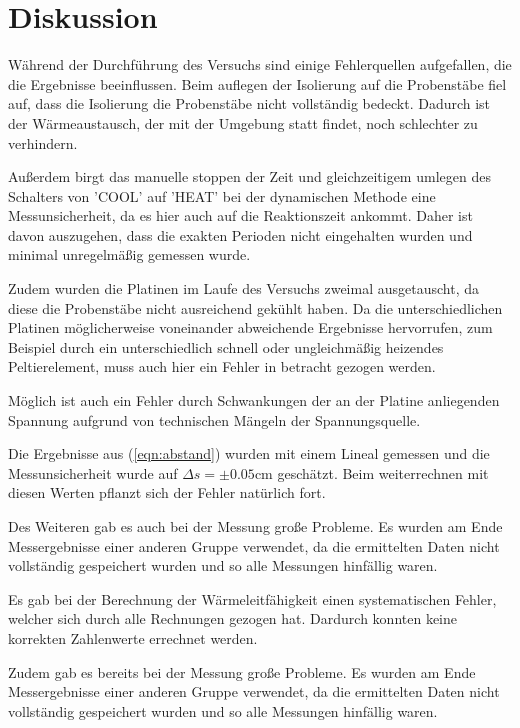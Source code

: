 \newpage
\section{Diskussion}
Während der Durchführung des Versuchs sind einige Fehlerquellen aufgefallen, die die Ergebnisse beeinflussen.
Beim auflegen der Isolierung auf die Probenstäbe fiel auf, dass die Isolierung die Probenstäbe nicht vollständig bedeckt.
Dadurch ist der Wärmeaustausch, der mit der Umgebung statt findet, noch schlechter zu verhindern.

\noindent Außerdem birgt das manuelle stoppen der Zeit und gleichzeitigem umlegen des Schalters von 'COOL' auf 'HEAT' bei der dynamischen Methode eine Messunsicherheit, 
da es hier auch auf die Reaktionszeit ankommt.
Daher ist davon auszugehen, dass die exakten Perioden nicht eingehalten wurden und minimal unregelmäßig gemessen wurde.

\noindent Zudem wurden die Platinen im Laufe des Versuchs zweimal ausgetauscht, da diese die Probenstäbe nicht ausreichend gekühlt haben.
Da die unterschiedlichen Platinen möglicherweise voneinander abweichende Ergebnisse hervorrufen, 
zum Beispiel durch ein unterschiedlich schnell oder ungleichmäßig heizendes Peltierelement, muss auch hier ein Fehler in betracht gezogen werden.

\noindent Möglich ist auch ein Fehler durch Schwankungen der an der Platine anliegenden Spannung aufgrund von technischen Mängeln der Spannungsquelle.

\noindent Die Ergebnisse aus (\ref{eqn:abstand})
wurden mit einem Lineal gemessen und die Messunsicherheit wurde auf $\Delta s=\pm 0.05 \si{\centi\meter}$ geschätzt.
Beim weiterrechnen mit diesen Werten pflanzt sich der Fehler natürlich fort.

\noindent
Des Weiteren gab es auch bei der Messung große Probleme.
Es wurden am Ende Messergebnisse einer anderen Gruppe verwendet, da die ermittelten Daten nicht vollständig gespeichert wurden und so alle Messungen hinfällig waren. 

\label{sec:Diskussion}

Es gab bei der Berechnung der Wärmeleitfähigkeit einen systematischen Fehler, welcher sich durch alle Rechnungen gezogen hat. Dardurch konnten keine korrekten Zahlenwerte errechnet werden.

Zudem gab es bereits bei der Messung große Probleme. Es wurden am Ende Messergebnisse einer anderen Gruppe verwendet, da die ermittelten Daten nicht vollständig gespeichert wurden und so 
alle Messungen hinfällig waren.